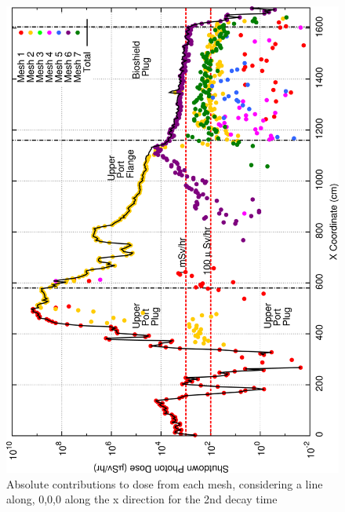 \documentclass[12pt]{article}
\begin{document}
\begin{figure}[ht!]
\centering
\includegraphics[clip,scale=0.25]{../plots/crosstalk/nob4c/up/dc2.png}
\caption{Absolute contributions to dose from each mesh, considering a line along, 0,0,0 along the x direction for the 2nd decay time}
\label{fig:ct_up_dc2}
\end{figure}
\end{document}
